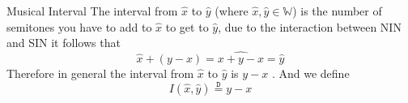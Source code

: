 \documentclass{standalone}
\begin{document}
\begin{defn*}{Musical Interval}
  The interval from  $ \widehat{x}$ to $ \widehat{y }$ (where $ \widehat{x}, \widehat{y} \in \mathbb{W}$) is the number of semitones you have to add to $ \widehat{x}$ to get to $ \widehat{y}$, due to the interaction between NIN and SIN it follows that 
  \[
    \widehat{x}  +  \left( y  -  x \right) = \widehat{x  +  y  -  x} = \widehat{y}
  \]
  Therefore in general the interval from $ \widehat{x}$  to $ \widehat{y}$ is $y  - x$ . And we define 
  \[
  I\left( \widehat{x}, \widehat{y}\right) \stackrel{\mathtt{D}}{=} y  -  x
  \]
\end{defn*}
\end{document}

